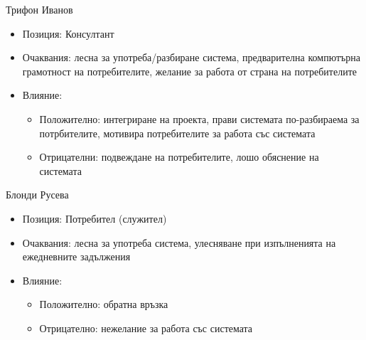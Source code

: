 \documentclass{beamer}
\begin{document}
\begin{frame}
    \begin{block}{Трифон Иванов}
        \begin{itemize}
            \item Позиция: Консултант
            \item Очаквания: лесна за употреба/разбиране система,
                предварителна компютърна грамотност на потребителите,
                желание за работа от страна на потребителите
            \item Влияние:
                \begin{itemize}
                    \item Положително: интегриране на проекта, прави
                        системата по-разбираема за потрбителите, мотивира
                        потребителите за работа със системата
                    \item Отрицателни: подвеждане на потребителите, лошо обяснение на системата
                \end{itemize}
        \end{itemize}
    \end{block}
\end{frame}

\begin{frame}
    \begin{block}{Блонди Русева}
        \begin{itemize}
            \item Позиция: Потребител (служител)
            \item Очаквания: лесна за употреба система, улесняване при
            изпълненията на ежедневните задължения
            \item Влияние:
            \begin{itemize}
                \item Положително: обратна връзка
                \item Отрицателно: нежелание за работа със системата
            \end{itemize}
        \end{itemize}
    \end{block}
\end{frame}
\end{document}
